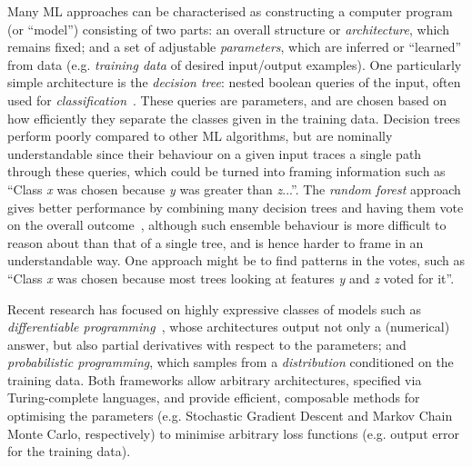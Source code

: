 \documentclass[letterpaper]{article}
\begin{document}
Many ML approaches can be characterised as constructing a computer
program (or ``model'') consisting of two parts: an overall structure
or \emph{architecture}, which remains fixed; and a set of adjustable
\emph{parameters}, which are inferred or ``learned'' from data
(e.g. \emph{training data} of desired input/output examples). One
particularly simple architecture is the \emph{decision tree}: nested
boolean queries of the input, often used for
\emph{classification}~\cite{safavian1991survey}. These queries are
parameters, and are chosen based on how efficiently they separate the
classes given in the training data.  Decision trees perform poorly compared to
other ML algorithms, but are nominally understandable since their behaviour on a
given input traces a single path through these queries, which could be turned
into framing information such as ``Class {\em x} was chosen because {\em y} was
greater than {\em z}...''.  The \emph{random forest} approach gives better
performance by combining many decision trees and having them vote on the overall
outcome~\cite{randomforests}, although such ensemble behaviour is more
difficult to reason about than that of a single tree, and is hence harder to
frame in an understandable way. One approach might be to find patterns in the
votes, such as ``Class {\em x} was chosen because most trees looking at features
{\em y} and {\em z} voted for it''.

Recent research has focused on highly expressive classes of models such as
\emph{differentiable programming}~\cite{wang2018demystifying}, whose
architectures output not only a (numerical) answer, but also partial derivatives
with respect to the parameters; and \emph{probabilistic programming}, which
samples from a \emph{distribution} conditioned on the training data. Both
frameworks allow arbitrary architectures, specified via Turing-complete
languages, and provide efficient, composable methods for optimising the
parameters (e.g. Stochastic Gradient Descent and Markov Chain Monte Carlo,
respectively) to minimise arbitrary loss functions (e.g. output error for the
training data).
\end{document}
